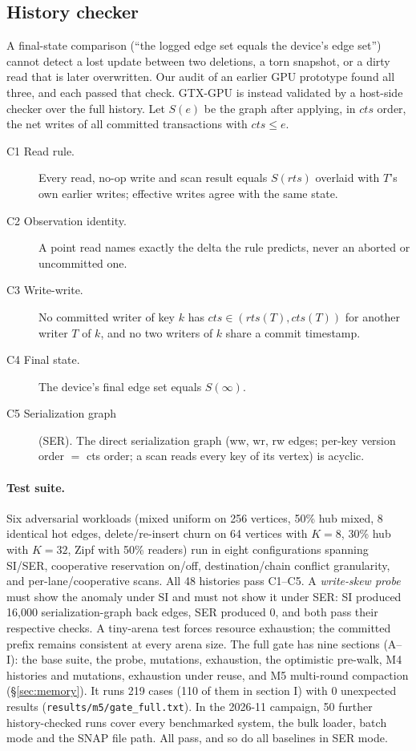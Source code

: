 \documentclass[sigconf,nonacm]{acmart}
\newcommand{\sys}{GTX-GPU}
\newcommand{\code}[1]{\texttt{#1}}
\begin{document}
\subsection{History checker}
\label{sec:checker}
A final-state comparison (``the logged edge set equals the device's edge set'') cannot detect a lost update between two
deletions, a torn snapshot, or a dirty read that is later overwritten. Our audit of an earlier GPU prototype found all
three, and each passed that check. \sys{} is instead validated by a host-side checker over the full history. Let
$S(e)$ be the graph after applying, in $cts$ order, the net writes of all committed transactions with $cts \le e$.
\begin{description}
\item[C1 Read rule.] Every read, no-op write and scan result equals $S(rts)$ overlaid with $T$'s own earlier writes;
effective writes agree with the same state.
\item[C2 Observation identity.] A point read names exactly the delta the rule predicts, never an aborted or
uncommitted one.
\item[C3 Write-write.] No committed writer of key $k$ has $cts \in (rts(T), cts(T))$ for another writer $T$ of $k$,
and no two writers of $k$ share a commit timestamp.
\item[C4 Final state.] The device's final edge set equals $S(\infty)$.
\item[C5 Serialization graph] (SER). The direct serialization graph (ww, wr, rw edges; per-key version order $=$ cts
order; a scan reads every key of its vertex) is acyclic.
\end{description}

\paragraph{Test suite.} Six adversarial workloads (mixed uniform on 256 vertices, 50\% hub mixed, 8 identical hot
edges, delete/re-insert churn on 64 vertices with $K{=}8$, 30\% hub with $K{=}32$, Zipf with 50\% readers) run in eight
configurations spanning SI/SER, cooperative reservation on/off, destination/chain conflict granularity, and
per-lane/cooperative scans. All 48 histories pass C1--C5. A \emph{write-skew probe} must show the anomaly under SI
and must not show it under SER: SI produced 16,000 serialization-graph back edges, SER produced 0, and both pass their
respective checks. A tiny-arena test forces resource exhaustion; the committed prefix remains consistent at every arena
size. The full gate has nine sections (A--I): the base suite, the probe, mutations, exhaustion, the optimistic
pre-walk, M4 histories and mutations, exhaustion under reuse, and M5 multi-round compaction
(\S\ref{sec:memory}). It runs 219 cases (110 of them in section I) with 0 unexpected results (\code{results/m5/gate\_full.txt}). In the 2026-11 campaign, 50 further
history-checked runs cover every benchmarked system, the bulk loader, batch mode and the SNAP file path. All pass,
and so do all baselines in SER mode.
\end{document}
